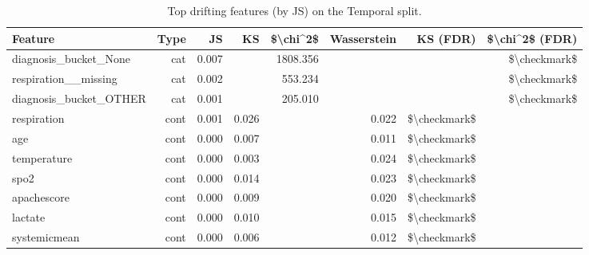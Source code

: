 \begin{table}
\caption{Top drifting features (by JS) on the Temporal split.}
\label{tab:topdrifting-temporal}
\begin{tabular}{lrrrrrrr}
\toprule
Feature & Type & JS & KS & \$\textbackslash chi\textasciicircum 2\$ & Wasserstein & KS (FDR) & \$\textbackslash chi\textasciicircum 2\$ (FDR) \\
\midrule
diagnosis\_bucket\_None & cat & 0.007 &  & 1808.356 &  &  & \$\textbackslash checkmark\$ \\
respiration\_\_missing & cat & 0.002 &  & 553.234 &  &  & \$\textbackslash checkmark\$ \\
diagnosis\_bucket\_OTHER & cat & 0.001 &  & 205.010 &  &  & \$\textbackslash checkmark\$ \\
respiration & cont & 0.001 & 0.026 &  & 0.022 & \$\textbackslash checkmark\$ &  \\
age & cont & 0.000 & 0.007 &  & 0.011 & \$\textbackslash checkmark\$ &  \\
temperature & cont & 0.000 & 0.003 &  & 0.024 & \$\textbackslash checkmark\$ &  \\
spo2 & cont & 0.000 & 0.014 &  & 0.023 & \$\textbackslash checkmark\$ &  \\
apachescore & cont & 0.000 & 0.009 &  & 0.020 & \$\textbackslash checkmark\$ &  \\
lactate & cont & 0.000 & 0.010 &  & 0.015 & \$\textbackslash checkmark\$ &  \\
systemicmean & cont & 0.000 & 0.006 &  & 0.012 & \$\textbackslash checkmark\$ &  \\
\bottomrule
\end{tabular}
\end{table}
